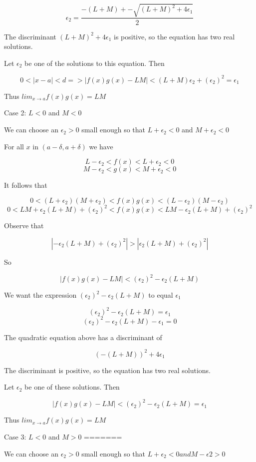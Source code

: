     $$ \epsilon_2 = \frac{-(L + M) +- \sqrt{(L + M)^2 + 4\epsilon_1}}{2} $$

The discriminant $(L + M)^2 + 4\epsilon_1$ is positive, so the equation has two real solutions.

Let $\epsilon_2$ be one of the solutions to this equation. Then

    $$ 0 < |x - a| < d => |f(x)g(x) - LM| < (L + M)\epsilon_2 + (\epsilon_2)^2 = \epsilon_1 $$

Thus $lim_{x \rightarrow a} f(x)g(x) = LM$

Case 2: $L < 0$ and $M < 0$

We can choose an $\epsilon_2 > 0$ small enough so that $L + \epsilon_2 < 0$ and $M + \epsilon_2 < 0$

For all $x$ in $(a - \delta, a + \delta)$ we have

    $$ L - \epsilon_2 < f(x) < L + \epsilon_2 < 0 $$ 
    $$ M - \epsilon_2 < g(x) < M + \epsilon_2 < 0 $$
 
It follows that

    $$ 0 < (L + \epsilon_2)(M + \epsilon_2) < f(x)g(x) < (L - \epsilon_2)(M - \epsilon_2) $$
    $$ 0 < LM + \epsilon_2(L + M) + (\epsilon_2)^2 < f(x)g(x) < LM - \epsilon_2(L + M) + (\epsilon_2)^2 $$

Observe that

    $$ |-\epsilon_2(L + M) + (\epsilon_2)^2| > |\epsilon_2(L + M) + (\epsilon_2)^2| $$

So

    $$ |f(x)g(x) - LM| < (\epsilon_2)^2 - \epsilon_2(L + M) $$

We want the expression $(\epsilon_2)^2 - \epsilon_2(L + M)$ to equal $\epsilon_1$

    $$ (\epsilon_2)^2 - \epsilon_2(L + M) = \epsilon_1 $$
    $$ (\epsilon_2)^2 - \epsilon_2(L + M) - \epsilon_1 = 0 $$

The quadratic equation above has a discriminant of

    $$ (-(L + M))^2 + 4\epsilon_1 $$

The discriminant is positive, so the equation has two real solutions.

Let $\epsilon_2$ be one of these solutions. Then

    $$ |f(x)g(x) - LM| < (\epsilon_2)^2 - \epsilon_2(L + M) = \epsilon_1 $$

Thus $lim_{x \rightarrow a} f(x)g(x) = LM$

Case 3: $L < 0$ and $M > 0$
=======

We can choose an $\epsilon_2 > 0$ small enough so that $L + \epsilon_2 < 0 and M - \epsilon2 > 0$

